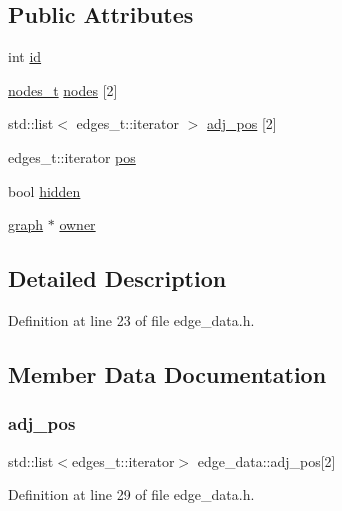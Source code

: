 \subsection*{Public Attributes}
\begin{DoxyCompactItemize}
\item 
int \mbox{\hyperlink{classedge__data_a33597ce417f8d86697b03fc8b6fea526}{id}}
\item 
\mbox{\hyperlink{edge_8h_a22ac17689106ba21a84e7bc54d1199d6}{nodes\+\_\+t}} \mbox{\hyperlink{classedge__data_a870bbbb05de6c5f63d434db624c55dd4}{nodes}} \mbox{[}2\mbox{]}
\item 
std\+::list$<$ edges\+\_\+t\+::iterator $>$ \mbox{\hyperlink{classedge__data_aa325caa449576727df8042bad875bf43}{adj\+\_\+pos}} \mbox{[}2\mbox{]}
\item 
edges\+\_\+t\+::iterator \mbox{\hyperlink{classedge__data_a178a8fd40a6ec8139291f96a7807f711}{pos}}
\item 
bool \mbox{\hyperlink{classedge__data_af8dc68051e5fe3336aa31ae1f3e104c3}{hidden}}
\item 
\mbox{\hyperlink{classgraph}{graph}} $\ast$ \mbox{\hyperlink{classedge__data_a00436f2956a69cd9dc8e5bfa530e0ce9}{owner}}
\end{DoxyCompactItemize}


\subsection{Detailed Description}


Definition at line 23 of file edge\+\_\+data.\+h.



\subsection{Member Data Documentation}
\mbox{\label{classedge__data_aa325caa449576727df8042bad875bf43}} 
\subsubsection{\texorpdfstring{adj\+\_\+pos}{adj\_pos}}
{\footnotesize\ttfamily std\+::list$<$edges\+\_\+t\+::iterator$>$ edge\+\_\+data\+::adj\+\_\+pos\mbox{[}2\mbox{]}}



Definition at line 29 of file edge\+\_\+data.\+h.

